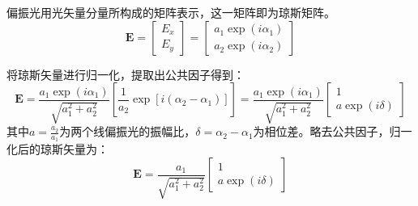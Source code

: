 \documentclass[type=master,oneside]{fduthesis}
\begin{document}
偏振光用光矢量分量所构成的矩阵表示，这一矩阵即为琼斯矩阵。
\begin{equation}
  \boldsymbol{E}=\left[\begin{array}{c}
      E_{x} \\
      E_{y}
    \end{array}\right]=\left[\begin{array}{l}
      a_{1} \exp \left(i \alpha_{1}\right) \\
      a_{2} \exp \left(i \alpha_{2}\right)
    \end{array}\right]
\end{equation}

将琼斯矢量进行归一化，提取出公共因子得到：
\begin{equation}
  \boldsymbol{E}=\frac{a_{1} \exp \left(i \alpha_{1}\right)}{\sqrt{a_{1}^{2}+a_{2}^{2}}}\left[\frac{1}{a_{2}} \exp \left[i\left(\alpha_{2}-\alpha_{1}\right)\right]\right]=\frac{a_{1} \exp \left(i \alpha_{1}\right)}{\sqrt{a_{1}^{2}+a_{2}^{2}}}\left[\begin{array}{c}
      1 \\
      a \exp (i \delta)
    \end{array}\right]
\end{equation}
其中$a=\frac{a_{2}}{a_{1}}$为两个线偏振光的振幅比，$ \delta=\alpha_{2}-\alpha_{1}$为相位差。略去公共因子，归一化后的琼斯矢量为：
\begin{equation}
  \boldsymbol{E}=\frac{a_{1}}{\sqrt{a_{1}^{2}+a_{2}^{2}}}\left[\begin{array}{c}
      1 \\
      a \exp (i \delta)
    \end{array}\right]
\end{equation}
\end{document}
